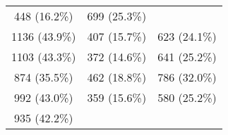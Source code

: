 \documentclass[10pt,]{article}
\begin{document}
\begin{longtable}[c]{@{}ccc@{}}
\begin{minipage}[t]{0.22\columnwidth}
448 (16.2\%)
\strut\end{minipage} &
\begin{minipage}[t]{0.38\columnwidth}\centering\strut
699 (25.3\%)
\strut\end{minipage}\tabularnewline
\begin{minipage}[t]{0.23\columnwidth}\centering\strut
1136 (43.9\%)
\strut\end{minipage} &
\begin{minipage}[t]{0.22\columnwidth}\centering\strut
407 (15.7\%)
\strut\end{minipage} &
\begin{minipage}[t]{0.38\columnwidth}\centering\strut
623 (24.1\%)
\strut\end{minipage}\tabularnewline
\begin{minipage}[t]{0.23\columnwidth}\centering\strut
1103 (43.3\%)
\strut\end{minipage} &
\begin{minipage}[t]{0.22\columnwidth}\centering\strut
372 (14.6\%)
\strut\end{minipage} &
\begin{minipage}[t]{0.38\columnwidth}\centering\strut
641 (25.2\%)
\strut\end{minipage}\tabularnewline
\begin{minipage}[t]{0.23\columnwidth}\centering\strut
874 (35.5\%)
\strut\end{minipage} &
\begin{minipage}[t]{0.22\columnwidth}\centering\strut
462 (18.8\%)
\strut\end{minipage} &
\begin{minipage}[t]{0.38\columnwidth}\centering\strut
786 (32.0\%)
\strut\end{minipage}\tabularnewline
\begin{minipage}[t]{0.23\columnwidth}\centering\strut
992 (43.0\%)
\strut\end{minipage} &
\begin{minipage}[t]{0.22\columnwidth}\centering\strut
359 (15.6\%)
\strut\end{minipage} &
\begin{minipage}[t]{0.38\columnwidth}\centering\strut
580 (25.2\%)
\strut\end{minipage}\tabularnewline
\begin{minipage}[t]{0.23\columnwidth}\centering\strut
935 (42.2\%)
\strut\end{minipage} &
\begin{minipage}[t]{0.22\columnwidth}\centering\strut

\end{minipage}
\end{longtable}
\end{document}

